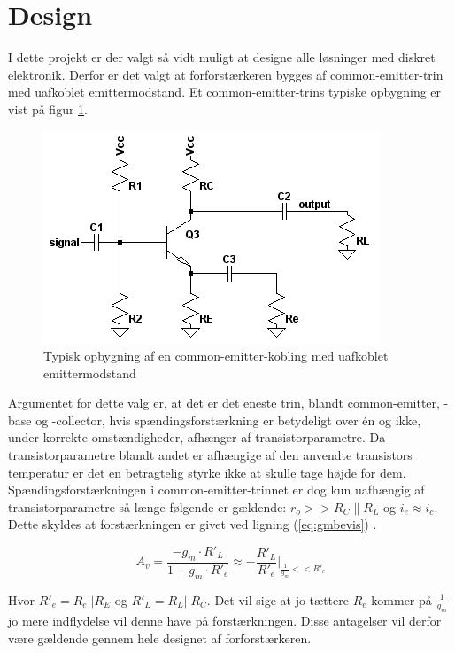 \section{Design}
I dette projekt er der valgt så vidt muligt at designe alle løsninger med diskret elektronik. Derfor er det valgt at forforstærkeren bygges af common-emitter-trin med uafkoblet emittermodstand. Et common-emitter-trins typiske opbygning er vist på figur \ref{fig:cekobling}.

\begin{figure}[h]
\centering
\includegraphics[scale=.6]{teknisk/forforstaerker/ceopkobling.png}
\caption{Typisk opbygning af en common-emitter-kobling med uafkoblet emittermodstand}
\label{fig:cekobling}
\end{figure}


Argumentet for dette valg er, at det er det eneste trin, blandt common-emitter, -base og -collector, hvis spændingsforstærkning er betydeligt over én og ikke, under korrekte omstændigheder, afhænger af transistorparametre. Da transistorparametre blandt andet er afhængige af den anvendte transistors temperatur er det en betragtelig styrke ikke at skulle tage højde for dem. Spændingsforstærkningen i common-emitter-trinnet er dog kun uafhængig af transistorparametre så længe følgende er gældende: $r_o >>R_C \| R_L$ og $i_e \approx i_c$.
Dette skyldes at forstærkningen er givet ved ligning (\ref{eq:gmbevis}) \cite{ael-mm6}.

\begin{equation}
A_v =  \frac{-g_m \cdot R'_L}{1+g_m \cdot R'_e} \approx  -\frac{R'_L}{R'_e} \Biggr\vert _{\frac{1}{g_m}<<R'_e}
\label{eq:gmbevis}
\end{equation}

Hvor $R'_e = R_e || R_E$ og $R'_L = R_L||R_C$. Det vil sige at jo tættere $R_e$ kommer på $\frac{1}{g_m}$ jo mere indflydelse vil denne have på forstærkningen. Disse antagelser vil derfor være gældende gennem hele designet af forforstærkeren. 

